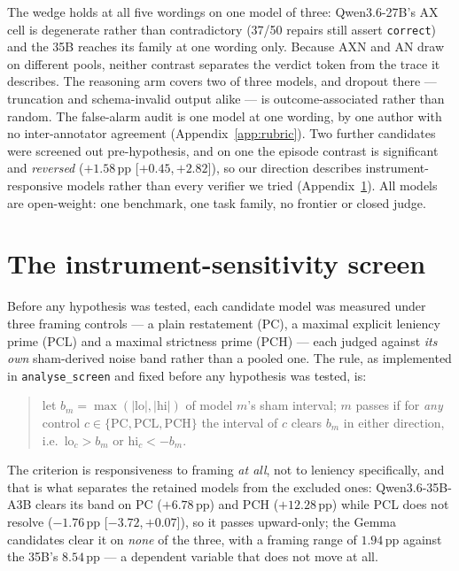 \documentclass[11pt]{article}
\newcommand{\pp}{\,\text{pp}}
\newcommand{\ci}[2]{{\footnotesize[$#1$,\,$#2$]}}
\begin{document}
The wedge holds at all five wordings on
one model of three: Qwen3.6-27B's AX cell is degenerate rather than contradictory (37/50 repairs
still assert \texttt{correct}) and the 35B reaches its family at one wording only. Because AXN and AN draw
on different pools, neither contrast separates the
verdict token from the trace it describes. The reasoning arm covers two of three models, and dropout
there --- truncation and schema-invalid output alike --- is outcome-associated rather than random. The
false-alarm audit is one model at one wording, by one author with no
inter-annotator agreement (Appendix~\ref{app:rubric}). Two further candidates were
screened out pre-hypothesis, and on one the episode contrast is significant and
\emph{reversed} ($+1.58\pp$ \ci{+0.45}{+2.82}), so our direction describes instrument-responsive
models rather than every verifier we tried (Appendix~\ref{app:screen}). All models are open-weight:
one benchmark, one task family, no frontier or closed judge.



\appendix

\section{The instrument-sensitivity screen}
\label{app:screen}

Before any hypothesis was tested, each candidate model was measured under three framing controls --- a
plain restatement (PC), a maximal explicit leniency prime (PCL) and a maximal strictness prime (PCH)
--- each judged against \emph{its own} sham-derived noise band rather than a pooled one. The rule, as
implemented in \texttt{analyse\_screen} and fixed before any hypothesis was tested, is:

\begin{quote}
let $b_m = \max(|\text{lo}|, |\text{hi}|)$ of model $m$'s sham interval; $m$ passes if for \emph{any}
control $c \in \{\text{PC}, \text{PCL}, \text{PCH}\}$ the interval of $c$ clears $b_m$ in either
direction, i.e.\ $\text{lo}_c > b_m$ or $\text{hi}_c < -b_m$.
\end{quote}

The criterion is responsiveness to framing \emph{at all}, not to leniency specifically, and that is
what separates the retained models from the excluded ones: Qwen3.6-35B-A3B clears its band on PC
($+6.78\pp$) and PCH ($+12.28\pp$) while PCL does not resolve ($-1.76\pp$ \ci{-3.72}{+0.07}), so it
passes upward-only; the Gemma candidates clear it on \emph{none} of the three, with a framing range of
$1.94\pp$ against the 35B's $8.54\pp$ --- a dependent variable that does not move at all.
\end{document}
